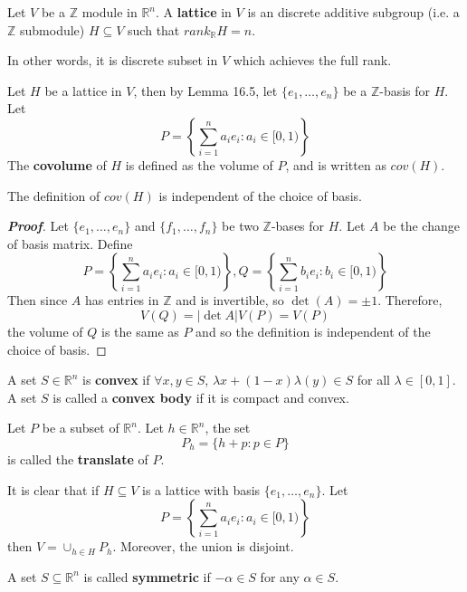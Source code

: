\begin{definition} Let $V$ be a $\mathbb{Z}$ module in $\mathbb{R}^n$. A {\bf lattice} in $V$ is an discrete additive subgroup (i.e. a $\mathbb{Z}$ submodule) $H \subseteq V$ such that $rank_\mathbb{R}H=n$.
\end{definition}
In other words, it is discrete subset in $V$ which achieves the full rank.
\begin{definition} Let $H$ be a lattice in $V$, then by Lemma 16.5, let $\{e_1,\ldots,e_n\}$ be a $\mathbb{Z}$-basis for $H$. Let
$$P=\left\{\sum_{i=1}^n a_ie_i: a_i \in [0,1)\right\}$$
The {\bf covolume} of $H$ is defined as the volume of $P$, and is written as $cov(H)$.
\end{definition}
\begin{proposition} The definition of $cov(H)$ is independent of the choice of basis.
\end{proposition}
\begin{proof}[\bf Proof] Let $\{e_1,\ldots,e_n\}$ and $\{f_1,\ldots,f_n\}$ be two $\mathbb{Z}$-bases for $H$. Let
$A$ be the change of basis matrix. Define
$$P=\left\{\sum_{i=1}^n a_ie_i: a_i \in [0,1)\right\}, Q=\left\{\sum_{i=1}^n b_ie_i: b_i \in [0,1)\right\}$$
Then since $A$ has entries in $\mathbb{Z}$ and is invertible, so $\det(A)=\pm 1$. Therefore,
$$V(Q)=|\det{A}|V(P)=V(P)$$
the volume of $Q$ is the same as $P$ and so the definition is independent of the choice of basis.
\end{proof}
\begin{definition} A set $S \in \mathbb{R}^n$ is {\bf convex} if $\forall x,y \in S$,
$\lambda x+(1-x)\lambda(y) \in S$ for all $\lambda \in [0,1]$. A set $S$ is called a {\bf convex body} if
it is compact and convex.
\end{definition}
\begin{definition} Let $P$ be a subset of $\mathbb{R}^n$. Let $h \in \mathbb{R}^n$, the set
$$P_h=\{h+p: p \in P\}$$
is called the {\bf translate} of $P$.
\end{definition}
\begin{remark}
It is clear that if $H \subseteq V$ is a lattice with basis $\{e_1,\ldots,e_n\}$. Let
$$P=\left\{\sum_{i=1}^n a_ie_i: a_i \in [0,1)\right\}$$
then $V=\cup_{h \in H}P_h$. Moreover, the union is disjoint.
\end{remark}
\begin{definition} A set $S \subseteq \mathbb{R}^n$ is called {\bf symmetric} if $-\alpha \in S$ for any
$\alpha \in S$.
\end{definition}
